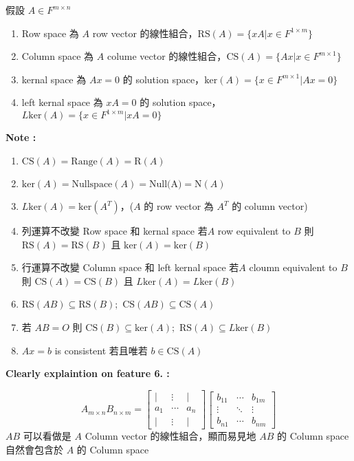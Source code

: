 \documentclass[
]{book}
\providecommand{\tightlist}{%
  \setlength{\itemsep}{0pt}\setlength{\parskip}{0pt}}
\begin{document}
假設 \(A \in F^{m \times n}\)

\begin{enumerate}
\def\labelenumi{\arabic{enumi}.}
\tightlist
\item
  Row space 為 \(A\) row vector 的線性組合，\(\mbox{RS}(A) = \{xA|x\in F^{1 \times m}\}\)
\item
  Column space 為 \(A\) colume vector 的線性組合，\(\mbox{CS}(A) = \{Ax|x\in F^{m\times 1}\}\)
\item
  kernal space 為 \(Ax = 0\) 的 solution space，\(\mbox{ker}(A) = \{x \in F^{m \times 1}|Ax = 0\}\)
\item
  left kernal space 為 \(xA = 0\) 的 solution space，\(L\mbox{ker}(A) = \{x \in F^{1 \times m}|xA = 0\}\)
\end{enumerate}

\textbf{Note :}

\begin{enumerate}
\def\labelenumi{\arabic{enumi}.}
\tightlist
\item
  \(\mbox{CS}(A) = \mbox{Range}(A) = \mbox{R}(A)\)
\item
  \(\mbox{ker}(A) = \mbox{Nullspace}(A) = \mbox{Null(A)} = \mbox{N}(A)\)
\item
  \(L\mbox{ker}(A) = \mbox{ker}(A^T)\)，(\(A\) 的 row vector 為 \(A^T\) 的 column vector)
\item
  列運算不改變 Row space 和 kernal space
  若\(A\) row equivalent to \(B\) 則 \(\mbox{RS}(A) = \mbox{RS}(B)\) 且 \(\mbox{ker}(A) = \mbox{ker}(B)\)
\item
  行運算不改變 Column space 和 left kernal space
  若\(A\) cloumn equivalent to \(B\) 則 \(\mbox{CS}(A) = \mbox{CS}(B)\) 且 \(L\mbox{ker}(A) = L\mbox{ker}(B)\)
\item
  \(\mbox{RS}(AB) \subseteq \mbox{RS}(B);\) \(\mbox{CS}(AB) \subseteq \mbox{CS}(A)\)
\item
  若 \(AB = O\) 則 \(\mbox{CS}(B)\subseteq \mbox{ker}(A);\) \(\mbox{RS}(A) \subseteq L\mbox{ker}(B)\)
\item
  \(Ax = b\) is consistent 若且唯若 \(b \in \mbox{CS}(A)\)
\end{enumerate}

\textbf{Clearly explaintion on feature 6. :}

\[A_{m \times n}B_{n \times m} = \begin{bmatrix}
 | & \vdots & | \\
 a_1 & \cdots & a_n \\
 | & \vdots & |
\end{bmatrix}\begin{bmatrix}
 b_{11} & \cdots & b_{1m}\\
 \vdots & \ddots & \vdots\\
 b_{n1} & \cdots & b_{nm}
\end{bmatrix}\]
\(AB\) 可以看做是 \(A\) Column vector 的線性組合，顯而易見地 \(AB\) 的 Column space 自然會包含於 \(A\) 的 Column space
\end{document}
